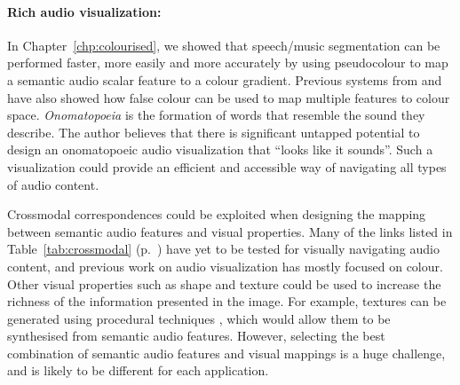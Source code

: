 \paragraph{Rich audio visualization:}

In Chapter~\ref{chp:colourised}, we showed that speech/music segmentation can be performed faster, more easily and more
accurately by using pseudocolour to map a semantic audio scalar feature to a colour gradient. Previous systems from
\citet{Tzanetakis2000} and \citet{Mason2007} have also showed how false colour can be used to map multiple features to
colour space.  \textit{Onomatopoeia} is the formation of words that resemble the sound they describe.  The author
believes that there is significant untapped potential to design an onomatopoeic audio visualization that ``looks like
it sounds''.  Such a visualization could provide an efficient and accessible way of navigating all types of audio
content.

Crossmodal correspondences could be exploited when designing the mapping between semantic audio features and visual
properties.  Many of the links listed in Table~\ref{tab:crossmodal} (p.~\pageref{tab:crossmodal}) have yet to be tested
for visually navigating audio content, and previous work on audio visualization has mostly focused on colour.  Other
visual properties such as shape and texture could be used to increase the richness of the information presented in the
image.  For example, textures can be generated using procedural techniques \citep{Ebert1994}, which would allow them to
be synthesised from semantic audio features.  However, selecting the best combination of semantic audio features and
visual mappings is a huge challenge, and is likely to be different for each application.



